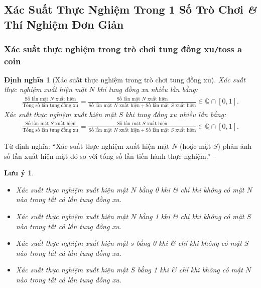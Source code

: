 \documentclass{article}
\numberwithin{equation}{section}
\newtheorem{dinhnghia}{Định nghĩa}[section]
\newtheorem{luuy}{Lưu ý}[section]
\begin{document}

\subsection{Xác Suất Thực Nghiệm Trong 1 Số Trò Chơi \textit{\&} Thí Nghiệm Đơn Giản}

\subsubsection{Xác suất thực nghiệm trong trò chơi tung đồng xu\texttt{/}toss a coin}
\begin{dinhnghia}[Xác suất thực nghiệm trong trò chơi tung đồng xu]
	\emph{Xác suất thực nghiệm xuất hiện mặt $N$} khi tung đồng xu nhiều lần bằng:
	\begin{align*}
		\frac{\mbox{Số lần mặt $N$ xuất hiện}}{\mbox{Tổng số lần tung đồng xu}} = \frac{\mbox{Số lần mặt $N$ xuất hiện}}{\mbox{Số lần mặt $N$ xuất hiện} + \mbox{Số lần mặt $S$ xuất hiện}}\in\mathbb{Q}\cap[0,1].
	\end{align*}
	\emph{Xác suất thực nghiệm xuất hiện mặt $S$} khi tung đồng xu nhiều lần bằng:
	\begin{align*}
		\frac{\mbox{Số lần mặt $S$ xuất hiện}}{\mbox{Tổng số lần tung đồng xu}} = \frac{\mbox{Số lần mặt $S$ xuất hiện}}{\mbox{Số lần mặt $N$ xuất hiện} + \mbox{Số lần mặt $S$ xuất hiện}}\in\mathbb{Q}\cap[0,1].
	\end{align*}
\end{dinhnghia}
Từ định nghĩa: ``Xác suất thực nghiệm xuất hiện mặt $N$ (hoặc mặt $S$) phản ảnh số lần xuất hiện mặt đó so với tổng số lần tiến hành thực nghiệm.'' -- \cite[p. 18]{SGK_Toan_6_Canh_Dieu_tap_2}

\begin{luuy}
	\begin{itemize}
		\item Xác suất thực nghiệm xuất hiện mặt $N$ bằng 0 khi \textit{\&} chỉ khi không có mặt $N$ nào trong tất cả lần tung đồng xu.
		\item Xác suất thực nghiệm xuất hiện mặt $N$ bằng 1 khi \textit{\&} chỉ khi không có mặt $S$ nào trong tất cả lần tung đồng xu.
		\item Xác suất thực nghiệm xuất hiện mặt $s$ bằng 0 khi \textit{\&} chỉ khi không có mặt $S$ nào trong tất cả lần tung đồng xu.
		\item Xác suất thực nghiệm xuất hiện mặt $S$ bằng 1 khi \textit{\&} chỉ khi không có mặt $N$ nào trong tất cả lần tung đồng xu.
	\end{itemize}
\end{luuy}
\end{document}

